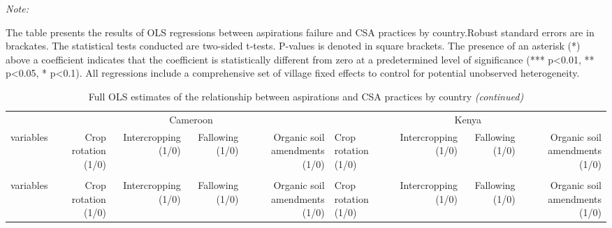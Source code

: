 \documentclass[
]{article}
\begin{document}
\begin{landscape}\begingroup\fontsize{7}{9}\selectfont

\begin{ThreePartTable}
\begin{TableNotes}[para]
\item \textit{Note: } 
\item The table presents the results of OLS regressions between aspirations failure and CSA practices by country.Robust standard errors are in brackates. The statistical tests conducted are two-sided t-tests. P-values is denoted in square brackets. The presence of an asterisk (*) above a coefficient indicates that the coefficient is statistically different from zero at a predetermined level of significance (*** p<0.01, ** p<0.05, * p<0.1). All regressions include a comprehensive set of village fixed effects to control for potential unobserved heterogeneity.
\end{TableNotes}
\begin{longtable}[t]{lrrrrlrrr}
\caption{\label{tab:unnamed-chunk-10} Full OLS estimates of the relationship between aspirations and CSA practices by country}\\
\toprule
\multicolumn{1}{c}{ } & \multicolumn{4}{c}{Cameroon} & \multicolumn{4}{c}{Kenya} \\
\cmidrule(l{3pt}r{3pt}){2-5} \cmidrule(l{3pt}r{3pt}){6-9}
variables & Crop rotation (1/0) & Intercropping (1/0) & Fallowing (1/0) & Organic soil amendments (1/0) & Crop rotation (1/0) & Intercropping (1/0) & Fallowing (1/0) & Organic soil amendments (1/0)\\
\midrule
\endfirsthead
\caption[]{\label{tab:unnamed-chunk-10} Full OLS estimates of the relationship between aspirations and CSA practices by country \textit{(continued)}}\\
\toprule
variables & Crop rotation (1/0) & Intercropping (1/0) & Fallowing (1/0) & Organic soil amendments (1/0) & Crop rotation (1/0) & Intercropping (1/0) & Fallowing (1/0) & Organic soil amendments (1/0)\\
\midrule
\endhead


\end{longtable}
\end{ThreePartTable}
\end{landscape}
\end{document}
